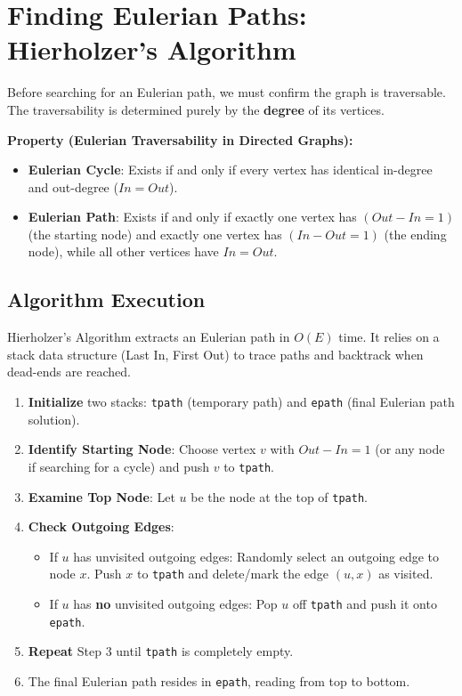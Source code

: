 \section{Finding Eulerian Paths: Hierholzer's Algorithm}
Before searching for an Eulerian path, we must confirm the graph is traversable. The traversability is determined purely by the \textbf{degree} of its vertices.

\textbf{Property (Eulerian Traversability in Directed Graphs):}
\begin{itemize}
    \item \textbf{Eulerian Cycle}: Exists if and only if every vertex has identical in-degree and out-degree ($In = Out$).
    \item \textbf{Eulerian Path}: Exists if and only if exactly one vertex has $(Out - In = 1)$ (the starting node) and exactly one vertex has $(In - Out = 1)$ (the ending node), while all other vertices have $In = Out$.
\end{itemize}

\subsection{Algorithm Execution}
Hierholzer's Algorithm extracts an Eulerian path in $O(E)$ time. It relies on a stack data structure (Last In, First Out) to trace paths and backtrack when dead-ends are reached.

\begin{enumerate}
    \item \textbf{Initialize} two stacks: \texttt{tpath} (temporary path) and \texttt{epath} (final Eulerian path solution).
    \item \textbf{Identify Starting Node}: Choose vertex $v$ with $Out - In = 1$ (or any node if searching for a cycle) and push $v$ to \texttt{tpath}.
    \item \textbf{Examine Top Node}: Let $u$ be the node at the top of \texttt{tpath}.
    \item \textbf{Check Outgoing Edges}:
        \begin{itemize}
            \item If $u$ has unvisited outgoing edges: Randomly select an outgoing edge to node $x$. Push $x$ to \texttt{tpath} and delete/mark the edge $(u,x)$ as visited.
            \item If $u$ has \textbf{no} unvisited outgoing edges: Pop $u$ off \texttt{tpath} and push it onto \texttt{epath}.
        \end{itemize}
    \item \textbf{Repeat} Step 3 until \texttt{tpath} is completely empty.
    \item The final Eulerian path resides in \texttt{epath}, reading from top to bottom.
\end{enumerate}

